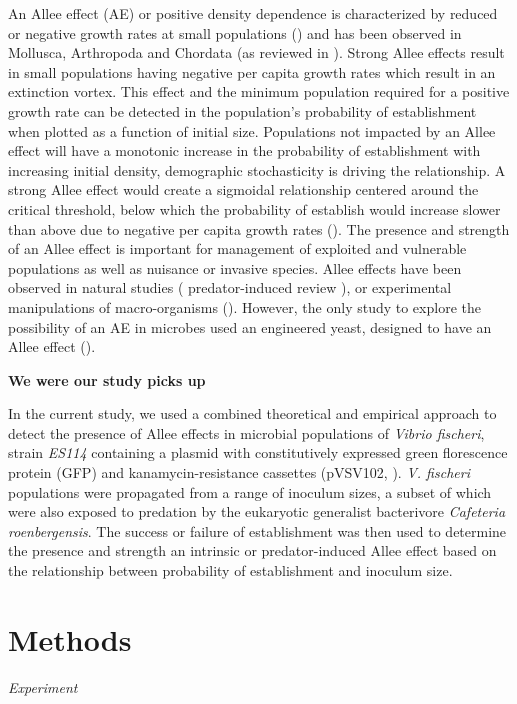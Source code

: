\documentclass[a4paper,10pt]{article}\usepackage[]{graphicx}\usepackage[]{color}
\begin{document}
An Allee effect (AE) or positive density dependence is characterized by reduced or negative growth rates at small populations (\cite{allee_studies_1932}) and has been observed in Mollusca, Arthropoda and Chordata (as reviewed in \cite{kramer_evidence_2009}).  Strong Allee effects result in small populations having negative per capita growth rates which result in an extinction vortex. This effect and the minimum population required for a positive growth rate can be detected in the population's probability of establishment when plotted as a function of initial size. Populations not impacted by an Allee effect will have a monotonic increase in the probability of establishment with increasing initial density, demographic stochasticity is driving the relationship.  A strong Allee effect would create a sigmoidal relationship centered around the critical threshold, below which the probability of establish would increase slower than above due to negative per capita growth rates (\cite{dennis_allee_2002}). The presence and strength of an Allee effect is important for management of exploited and vulnerable populations as well as nuisance or invasive species. Allee effects have been observed in natural studies (\cite{angulo_double_2007} predator-induced review \cite{gascoigne_allee_2004}), or experimental manipulations of macro-organisms (\cite{kramer_experimental_2010, ward_predators_2008}). However, the only study to explore the possibility of an AE in microbes used an engineered yeast, designed to have an Allee effect (\cite{dai_generic_2012}).

\textbf{We were our study picks up}

In the current study, we used a combined theoretical and empirical approach to detect the presence of Allee effects in microbial populations of \textit{Vibrio fischeri}, strain \textit{ES114} containing a plasmid with constitutively expressed green florescence protein (GFP) and kanamycin-resistance cassettes (pVSV102, \cite{dunn_new_2006}). \textit{V. fischeri} populations were propagated from a range of inoculum sizes, a subset of which were also exposed to predation by the eukaryotic generalist bacterivore \textit{Cafeteria roenbergensis}. The success or failure of establishment was then used to determine the presence and strength an intrinsic or predator-induced Allee effect based on the relationship between probability of establishment and inoculum size. 

\section{Methods}
\textit{Experiment}
\end{document}
